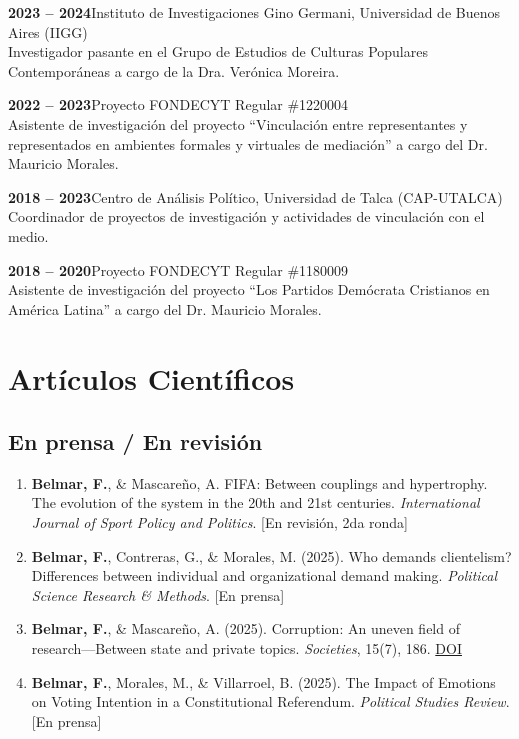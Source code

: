 \documentclass[11pt,a4paper]{article}
\newcommand{\cventry}[2]{\noindent\textbf{#1}\hfill #2\\}
\newcommand{\cventrysub}[1]{\noindent\hspace{0.5cm}#1\par\vspace{2pt}}
\begin{document}
\vspace{4pt}

\cventry{2023 -- 2024}{Instituto de Investigaciones Gino Germani, Universidad de Buenos Aires (IIGG)}
\cventrysub{Investigador pasante en el Grupo de Estudios de Culturas Populares Contemporáneas a cargo de la Dra. Verónica Moreira.}

\vspace{4pt}

\cventry{2022 -- 2023}{Proyecto FONDECYT Regular \#1220004}
\cventrysub{Asistente de investigación del proyecto ``Vinculación entre representantes y representados en ambientes formales y virtuales de mediación'' a cargo del Dr. Mauricio Morales.}

\vspace{4pt}

\cventry{2018 -- 2023}{Centro de Análisis Político, Universidad de Talca (CAP-UTALCA)}
\cventrysub{Coordinador de proyectos de investigación y actividades de vinculación con el medio.}

\vspace{4pt}

\cventry{2018 -- 2020}{Proyecto FONDECYT Regular \#1180009}
\cventrysub{Asistente de investigación del proyecto ``Los Partidos Demócrata Cristianos en América Latina'' a cargo del Dr. Mauricio Morales.}

\section{Artículos Científicos}

\subsection{En prensa / En revisión}

\begin{enumerate}[leftmargin=*, label=\arabic*., start=11]
    \item \textbf{Belmar, F.}, \& Mascareño, A. FIFA: Between couplings and hypertrophy. The evolution of the system in the 20th and 21st centuries. \textit{International Journal of Sport Policy and Politics}. [En revisión, 2da ronda]

    \item \textbf{Belmar, F.}, Contreras, G., \& Morales, M. (2025). Who demands clientelism? Differences between individual and organizational demand making. \textit{Political Science Research \& Methods}. [En prensa]

    \item \textbf{Belmar, F.}, \& Mascareño, A. (2025). Corruption: An uneven field of research—Between state and private topics. \textit{Societies}, 15(7), 186. \href{https://doi.org/10.3390/soc15070186}{DOI}

    \item \textbf{Belmar, F.}, Morales, M., \& Villarroel, B. (2025). The Impact of Emotions on Voting Intention in a Constitutional Referendum. \textit{Political Studies Review}. [En prensa]
\end{enumerate}
\end{document}
